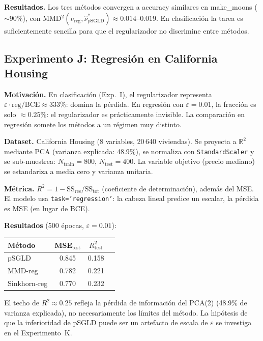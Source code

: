 \documentclass[11pt, a4paper]{article}
\theoremstyle{definition}
\newcommand{\R}{\mathbb{R}}
\begin{document}
\textbf{Resultados.} Los tres métodos convergen a accuracy similares en
make\_moons ($\sim 90\%$), con MMD$^2(\nu_\text{reg}, \hat{\nu}^*_\text{pSGLD})
\approx 0.014$--$0.019$. En clasificación la tarea es suficientemente
sencilla para que el regularizador no discrimine entre métodos.

\subsection{Experimento J: Regresión en California Housing}
\label{sec:exp_j}

\textbf{Motivación.} En clasificación (Exp.~I), el regularizador representa
$\varepsilon\cdot\mathrm{reg}/\text{BCE} \approx 333\%$: domina la pérdida.
En regresión con $\varepsilon=0.01$, la fracción es solo $\approx 0.25\%$:
el regularizador es prácticamente invisible. La comparación en regresión
somete los métodos a un régimen muy distinto.

\textbf{Dataset.} California Housing (8 variables, 20\,640 viviendas).
Se proyecta a $\R^2$ mediante PCA (varianza explicada: 48.9\%),
se normaliza con \texttt{StandardScaler} y se sub-muestrea:
$N_\text{train}=800$, $N_\text{test}=400$.
La variable objetivo (precio mediano) se estandariza a media cero y varianza unitaria.

\textbf{Métrica.} $R^2 = 1 - \mathrm{SS_{res}}/\mathrm{SS_{tot}}$
(coeficiente de determinación), además del MSE.
El modelo usa \texttt{task='regression'}: la cabeza lineal predice un escalar,
la pérdida es MSE (en lugar de BCE).

\textbf{Resultados} (500 épocas, $\varepsilon=0.01$):
\begin{center}
\begin{tabular}{lccc}
\toprule
Método & MSE$_\text{test}$ & $R^2_\text{test}$ \\
\midrule
pSGLD    & 0.845 & 0.158 \\
MMD-reg  & 0.782 & 0.221 \\
Sinkhorn-reg & 0.770 & 0.232 \\
\bottomrule
\end{tabular}
\end{center}
El techo de $R^2 \approx 0.25$ refleja la pérdida de información del PCA(2)
(48.9\% de varianza explicada), no necesariamente los límites del método.
La hipótesis de que la inferioridad de pSGLD puede ser un artefacto de
escala de $\varepsilon$ se investiga en el Experimento~K.
\end{document}
